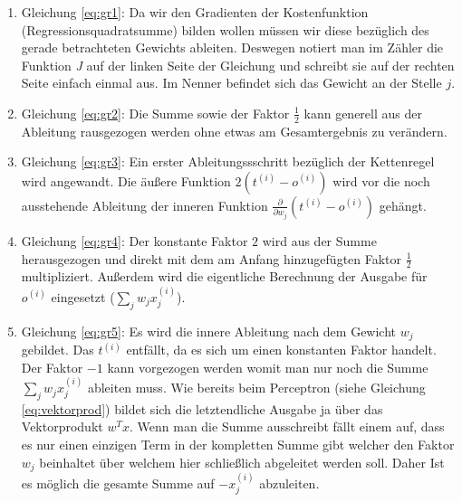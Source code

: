 \begin{enumerate}

\item Gleichung \ref{eq:gr1}: Da wir den Gradienten der Kostenfunktion (Regressionsquadratsumme) bilden wollen müssen wir diese bezüglich des gerade betrachteten Gewichts ableiten. Deswegen notiert man im Zähler die Funktion \emph{J} auf der linken Seite der Gleichung und schreibt sie auf der rechten Seite einfach einmal aus. Im Nenner befindet sich das Gewicht an der Stelle $j$. 

\item Gleichung \ref{eq:gr2}: Die Summe sowie der Faktor $\frac{1}{2}$ kann generell aus der Ableitung rausgezogen werden ohne etwas am Gesamtergebnis zu verändern. 

\item Gleichung \ref{eq:gr3}: Ein erster Ableitungssschritt bezüglich der Kettenregel wird angewandt. Die äußere Funktion $ 2 (t^{(i)} - o^{(i)}) $ wird vor die noch ausstehende Ableitung der inneren Funktion $  \frac{\partial }{\partial w_j} (t^{(i)} - o^{(i)}) $ gehängt. 

\item Gleichung \ref{eq:gr4}: Der konstante Faktor $2$ wird aus der Summe herausgezogen und direkt mit dem am Anfang hinzugefügten Faktor $ \frac{1}{2} $ multipliziert. Außerdem wird die eigentliche Berechnung der Ausgabe für $ o^{(i)} $ eingesetzt ($\sum_j w_j x^{(i)}_{j}$). 

\item Gleichung \ref{eq:gr5}: Es wird die innere Ableitung nach dem Gewicht $w_j$ gebildet. Das $t^{(i)}$ entfällt, da es sich um einen konstanten Faktor handelt. Der Faktor $-1$ kann vorgezogen werden womit man nur noch die Summe $ \sum_j w_j x^{(i)}_{j} $ ableiten muss. Wie bereits beim Perceptron (siehe Gleichung \ref{eq:vektorprod}) bildet sich die letztendliche Ausgabe ja über das Vektorprodukt ${w^Tx}$. Wenn man die Summe ausschreibt fällt einem auf, dass es nur einen einzigen Term in der kompletten Summe gibt welcher den Faktor $w_j$ beinhaltet über welchem hier schließlich abgeleitet werden soll. Daher Ist es möglich die gesamte Summe auf $-x^{(i)}_{j}$ abzuleiten. 

\end{enumerate}

